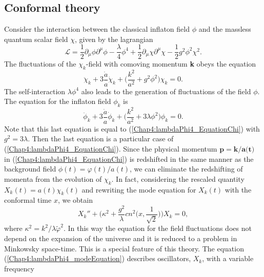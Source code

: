 \documentclass[11pt,a4paper,twoside]{book}
\begin{document}
 \subsection{Conformal theory}
 Consider the interaction between the classical inflaton field $\phi$ and the massless quantum scalar field $\chi$, given by the lagrangian
 \begin{equation}
\label{Chap4:lambdaPhi4_Lagrangian}
\mathcal{L}=\frac{1}{2}\partial_{\mu}\phi\partial^{\mu}\phi - \frac{\lambda }{4}\phi^{4} + \frac{1}{2}\partial_{\mu}\chi\partial^{\mu}\chi - \frac{1}{2}g^{2}\phi^{2}\chi^{2}.
 \end{equation}
 The fluctuations of the $\chi_{k}$-field with comoving momentum \textbf{k} obeys the equation
 \begin{equation}
\label{Chap4:lambdaPhi4_EquationChi}
\ddot{\chi}_{k} + 3\frac{\dot{a}}{a}\dot{\chi}_{k} + \Bigg(\frac{k^{2}}{a^{2}} + g^{2}\phi^{2}\Bigg)\chi_{k}= 0.
 \end{equation}
 The self-interaction $\lambda\phi^{4}$ also leads to the generation of fluctuations of the field $\phi$. The equation for the inflaton field $\phi_{k}$
is 
\begin{equation}
\label{Chap4:lambdaPhi4_EquationPhik}
\ddot{\phi}_{k} + 3\frac{\dot{a}}{a}\dot{\phi}_{k} + \Bigg(\frac{k^{2}}{a^{2}} + 3\lambda\phi^{2}\Bigg) \phi_{k}= 0.
\end{equation} 
Note that this last equation is equal to (\ref{Chap4:lambdaPhi4_EquationChi}) with $ g^{2}=3\lambda $. Then the last equation is a particular case of (\ref{Chap4:lambdaPhi4_EquationChi}). Since the physical momentum $ \textbf{p}=\textbf{k}/\textbf{a(t)} $ in (\ref{Chap4:lambdaPhi4_EquationChi}) is redshifted in the same manner as the background field $ \phi(t) = \varphi(t)/a(t) $, we can eliminate the redshifting of momenta from the evolution of $\chi_{k}$. In fact, considering the rescaled quantity $ X_{k}(t) = a(t)\chi_{k}(t) $ and rewriting the mode equation for $ X_{k}(t) $ with the conformal time $ x $, we obtain
\begin{equation}
\label{Chap4:lambdaPhi4_modeEquation}
X_{k}'' + \Bigg(\kappa^{2} + \frac{g^{2}}{\lambda}cn^{2}\Bigg(x,\frac{1}{\sqrt{2}}\Bigg)\Bigg)X_{k} = 0,
\end{equation}
where $\kappa^{2}=k^{2}/\lambda \tilde{\varphi}^{2}$. In this way the equation for the field fluctuations does not depend on the expansion of the universe and it is reduced to a problem in Minkowsky space-time. This is a special feature of this theory. The equation (\ref{Chap4:lambdaPhi4_modeEquation}) describes oscillators, $ X_{k} $, with a variable frequency
\end{document}
